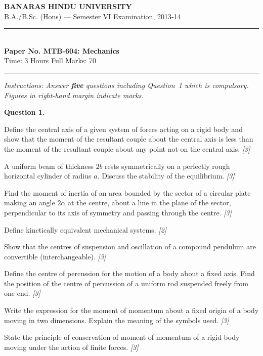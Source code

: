 \documentclass[11pt,a4paper]{article}
\newcommand{\pts}[1]{\hfill   \textit{[#1]}}
\begin{document}
\begin{center}
  {\large\bfseries BANARAS HINDU UNIVERSITY}\\[2pt]
  {\normalsize B.A./B.Sc. (Hons) --- Semester VI Examination, 2013-14}\\[6pt]
  \rule{0.8\linewidth}{0.5pt}\\[6pt]
  {\large\bfseries Paper No. MTB-604: Mechanics}\\[4pt]
  {\normalsize Time: 3 Hours \hfill Full Marks: 70}
\end{center}
\rule{\linewidth}{0.4pt}
\smallskip



\noindent   \textit{Instructions: Answer   \textbf{five} questions including Question~1 which is compulsory. Figures in right-hand margin indicate marks.}
\bigskip




\noindent   \textbf{Question 1.}

\begin{parts}
  \item Define the central axis of a given system of forces acting on a rigid body and show that the moment of the resultant couple about the central axis is less than the moment of the resultant couple about any point not on the central axis. \pts{3}
  \item A uniform beam of thickness $2b$ rests symmetrically on a perfectly rough horizontal cylinder of radius $a$. Discuss the stability of the equilibrium. \pts{3}
  \item Find the moment of inertia of an area bounded by the sector of a circular plate making an angle $2\alpha$ at the centre, about a line in the plane of the sector, perpendicular to its axis of symmetry and passing through the centre. \pts{3}
  \item Define kinetically equivalent mechanical systems. \pts{2}
  \item Show that the centres of suspension and oscillation of a compound pendulum are convertible (interchangeable). \pts{3}
  \item Define the centre of percussion for the motion of a body about a fixed axis. Find the position of the centre of percussion of a uniform rod suspended freely from one end. \pts{3}
  \item Write the expression for the moment of momentum about a fixed origin of a body moving in two dimensions. Explain the meaning of the symbols used. \pts{3}
  \item State the principle of conservation of moment of momentum of a rigid body moving under the action of finite forces. \pts{3}
\end{parts}
\end{document}
